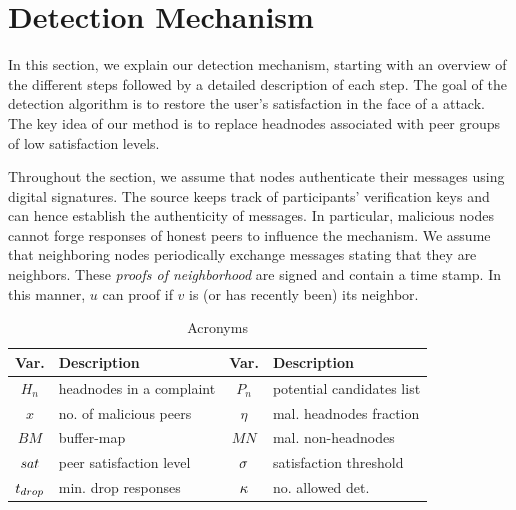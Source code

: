 \section{Detection Mechanism}
\label{sec:detection}


In this section, we explain our detection mechanism, starting with an overview of the different steps followed by a detailed description of each step.  
The goal of the detection algorithm is to restore the user's satisfaction in the face of a \drop attack. The key idea of our method is to replace headnodes associated with peer groups of low satisfaction levels. 

Throughout the section, we assume that nodes authenticate their messages using digital signatures. 
The source keeps track of participants' verification keys and can hence establish the authenticity of messages.
In particular, malicious nodes cannot forge responses of honest peers to influence the mechanism. 
We assume that neighboring nodes periodically exchange messages stating that they are neighbors.
These \emph{proofs of neighborhood} are signed and contain a time stamp. 
In this manner, $u$ can proof if $v$ is (or has recently been) its neighbor. 


\begin{table}[ht]
\center
\caption{Acronyms}
\begin{tabular}{|c|l||c|l|}
\hline

\bf{Var.} & \bf{Description}  & \bf{Var.} & \bf{Description} \\\hline\hline
$H_n$ & headnodes in a complaint & $P_n$ & potential candidates list \\\hline
$x$ & no. of malicious peers & $\eta$ & mal. headnodes fraction\\\hline
$BM$ & buffer-map & $MN$ & mal. non-headnodes \\\hline
$sat$ & peer satisfaction level & $\sigma$ & satisfaction threshold \\\hline
$t_{drop}$ & min. drop responses & $\kappa$ & no. allowed det. \\\hline
\end{tabular}
\label{tab:acronyms}
\vspace{-3mm}
\end{table}



